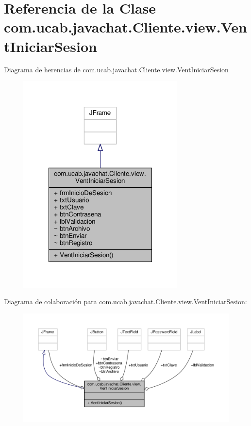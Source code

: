 \hypertarget{classcom_1_1ucab_1_1javachat_1_1_cliente_1_1view_1_1_vent_iniciar_sesion}{\section{Referencia de la Clase com.\-ucab.\-javachat.\-Cliente.\-view.\-Vent\-Iniciar\-Sesion}
\label{classcom_1_1ucab_1_1javachat_1_1_cliente_1_1view_1_1_vent_iniciar_sesion}
}


Diagrama de herencias de com.\-ucab.\-javachat.\-Cliente.\-view.\-Vent\-Iniciar\-Sesion\nopagebreak
\begin{figure}[H]
\begin{center}
\leavevmode
\includegraphics[width=238pt]{classcom_1_1ucab_1_1javachat_1_1_cliente_1_1view_1_1_vent_iniciar_sesion__inherit__graph}
\end{center}
\end{figure}


Diagrama de colaboración para com.\-ucab.\-javachat.\-Cliente.\-view.\-Vent\-Iniciar\-Sesion\-:\nopagebreak
\begin{figure}[H]
\begin{center}
\leavevmode
\includegraphics[width=350pt]{classcom_1_1ucab_1_1javachat_1_1_cliente_1_1view_1_1_vent_iniciar_sesion__coll__graph}
\end{center}
\end{figure}
